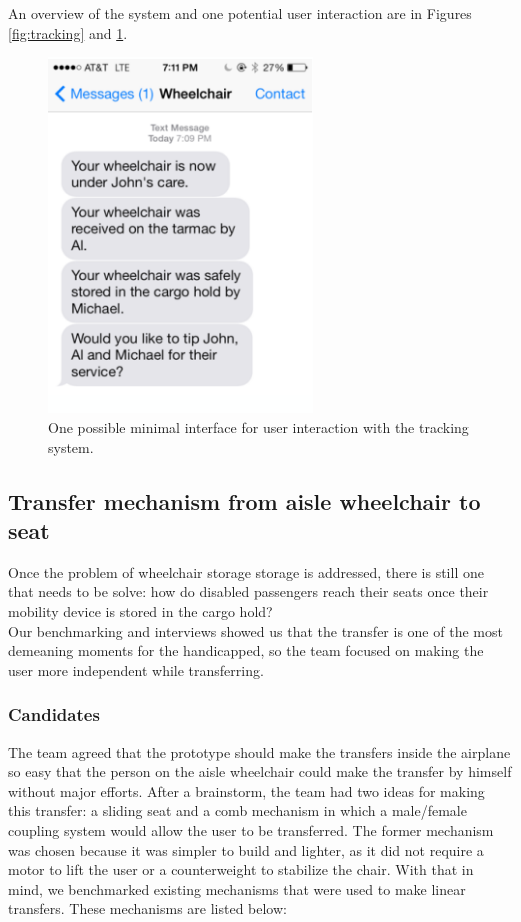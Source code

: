 An overview of the system and one potential user interaction are in Figures \ref{fig:tracking} and \ref{fig:tips}.


\begin{figure}[h]
  \centering
     \includegraphics[width=7cm]{images/tips.png}
   \caption{One possible minimal interface for user interaction with the tracking system.}
  \label{fig:tips}
\end{figure}

\newpage

\subsection{Transfer mechanism from aisle wheelchair to seat}

Once the problem of wheelchair storage storage is addressed, there is still one that needs to be solve: how do disabled passengers reach their seats once their mobility device is stored in the cargo hold? \\

Our benchmarking and interviews showed us that the transfer is one of the most demeaning moments for the handicapped, so the team focused on making the user more independent while transferring. \\

\subsubsection{Candidates}
The team agreed that the prototype should make the transfers inside the airplane so easy that the person on the aisle wheelchair could make the transfer by himself without major efforts. After a brainstorm, the team had two ideas for making this transfer: a sliding seat and a comb mechanism in which a male/female coupling system would allow the user to be transferred. The former mechanism was chosen because it was simpler to build and lighter, as it did not require a motor to lift the user or a counterweight to stabilize the chair. With that in mind, we benchmarked existing mechanisms that were used to make linear transfers. These mechanisms are listed below: \\

